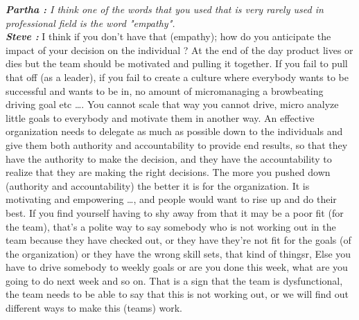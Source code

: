 \documentclass[a4paper, 12pt]{article}
\begin{document}
\begin{flushleft}
        \textit {\textbf {Partha :}  I think one of the words that you used that is very rarely used in professional field  is the word "empathy". }\\
        \textit {\textbf {Steve :}} I think if you don't have that (empathy); how do you anticipate the impact of your decision on the individual ? At the end of the day product lives or dies but the team should be motivated and pulling it together. If you fail to pull that off (as a leader), if you fail to create a culture where everybody wants to be successful and wants to be in, no amount of micromanaging a browbeating driving goal etc \ldots. You cannot scale that way you cannot drive, micro analyze little goals to everybody and motivate them in another way. An effective organization needs to delegate as much as possible down to the individuals and give them both authority and accountability to provide end results, so that they have the authority to make the decision, and they have the accountability to realize that they are making the right decisions. The more you pushed down (authority and accountability) the better it is for the organization. It is motivating and empowering \ldots, and people would want to rise up and do their best. If you find yourself having to shy away from that it may be a poor fit (for the team), that's a polite way to say somebody who is not working out in the team because they have checked out, or they have they're not fit for the goals (of the organization) or they have the wrong skill sets, that kind of thingsr, Else you have to drive somebody to weekly goals or are you done this week, what are you going to do next week and so on. That is a sign that the team is dysfunctional, the team needs to be able to say that this is not working out, or we will find out different ways to make this (teams) work. \\~\\


\end{flushleft}
\end{document}
